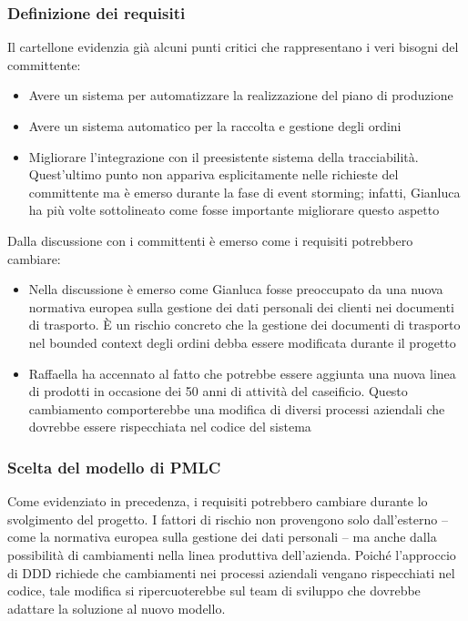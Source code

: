 \subsubsection{Definizione dei requisiti}
Il cartellone evidenzia già alcuni punti critici che rappresentano i veri bisogni del committente:
\begin{itemize}
  \item Avere un sistema per automatizzare la realizzazione del piano di produzione
  \item Avere un sistema automatico per la raccolta e gestione degli ordini
  \item Migliorare l'integrazione con il preesistente sistema della tracciabilità. Quest'ultimo punto non appariva esplicitamente nelle richieste del committente ma è emerso durante la fase di event storming; infatti, Gianluca ha più volte sottolineato come fosse importante migliorare questo aspetto
\end{itemize}

Dalla discussione con i committenti è emerso come i requisiti potrebbero cambiare:
\begin{itemize}
  \item Nella discussione è emerso come Gianluca fosse preoccupato da una nuova normativa europea sulla gestione dei dati personali dei clienti nei documenti di trasporto. È un rischio concreto che la gestione dei documenti di trasporto nel bounded context degli ordini debba essere modificata durante il progetto
  \item Raffaella ha accennato al fatto che potrebbe essere aggiunta una nuova linea di prodotti in occasione dei 50 anni di attività del caseificio. Questo cambiamento comporterebbe una modifica di diversi processi aziendali che dovrebbe essere rispecchiata nel codice del sistema
\end{itemize}

\subsubsection{Scelta del modello di PMLC}
\label{sec:seconda-riunione-pmlc}
Come evidenziato in precedenza, i requisiti potrebbero cambiare durante lo svolgimento del progetto. I fattori di rischio non provengono solo dall'esterno -- come la normativa europea sulla gestione dei dati personali -- ma anche dalla possibilità di cambiamenti nella linea produttiva dell'azienda.
Poiché l'approccio di DDD richiede che cambiamenti nei processi aziendali vengano rispecchiati nel codice, tale modifica si ripercuoterebbe sul team di sviluppo che dovrebbe adattare la soluzione al nuovo modello.


